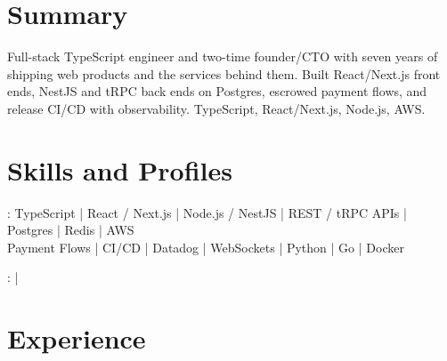 \documentclass[print]{jack-resume}
\begin{document}
\pagecolor{darkmodeBackground}


\begin{minipage}[t][1cm][t]{.03\textwidth}
    \hfill
\end{minipage}

\section{Summary}
Full-stack TypeScript engineer and two-time founder/CTO with seven years of shipping web products and the services behind them. Built React/Next.js front ends, NestJS and tRPC back ends on Postgres, escrowed payment flows, and release CI/CD with observability. TypeScript, React/Next.js, Node.js, AWS.
\sectionsep

\section{Skills and Profiles}
:
TypeScript \hfill | \hfill
React / Next.js \hfill | \hfill
Node.js / NestJS \hfill | \hfill
REST / tRPC APIs \hfill | \hfill
Postgres \hfill | \hfill
Redis \hfill | \hfill
AWS \\
\hspace{1.0cm} Payment Flows \hfill | \hfill
CI/CD \hfill | \hfill
Datadog \hfill | \hfill
WebSockets \hfill | \hfill
Python \hfill | \hfill
Go \hfill | \hfill
Docker \\

\raggedright{
    :
      \href{https://www.linkedin.com/in/jack-sturtevant/}{ \ExternalLink} |
     \href{https://github.com/jacksturt}{ \ExternalLink}}

\section{Experience}
\end{document}
